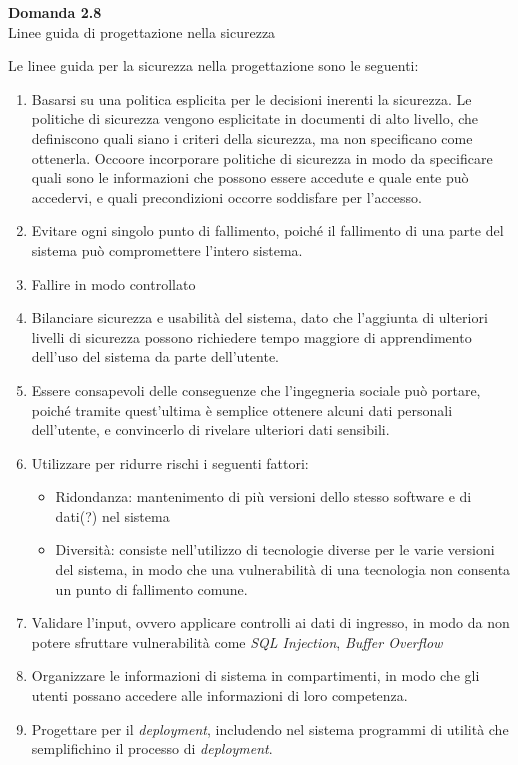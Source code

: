 \documentclass{article}
\newenvironment{problem}[2][Domanda]
    { \begin{mdframed}[backgroundcolor=gray!20] \textbf{#1 #2} \\}
    {  \end{mdframed}}
\begin{document}
\begin{problem}{2.8}
Linee guida di progettazione nella sicurezza
\end{problem}
Le linee guida per la sicurezza nella progettazione sono le seguenti:
\begin{enumerate}
	\item Basarsi su una politica esplicita per le decisioni inerenti la sicurezza.
	\newline
	Le politiche di sicurezza vengono esplicitate in documenti di alto livello, che definiscono quali siano i criteri della sicurezza, ma non specificano come ottenerla.
	Occoore incorporare politiche di sicurezza in modo da specificare quali sono le informazioni che possono essere accedute e quale ente può accedervi, e quali precondizioni occorre soddisfare per l'accesso.
	\item Evitare ogni singolo punto di fallimento, poiché il fallimento di una parte del sistema può compromettere l'intero sistema.
	\item Fallire in modo controllato
	\item Bilanciare sicurezza e usabilità del sistema, dato che l'aggiunta di ulteriori livelli di sicurezza possono richiedere tempo maggiore di apprendimento dell'uso del sistema da parte dell'utente.
	\item Essere consapevoli delle conseguenze che l'ingegneria sociale può portare, poiché tramite quest'ultima è semplice ottenere alcuni dati personali dell'utente, e convincerlo di rivelare ulteriori dati sensibili.
	\item Utilizzare per ridurre rischi i seguenti fattori:
	\begin{itemize}
		\item Ridondanza: mantenimento di più versioni dello stesso software e di dati(?) nel sistema
		\item Diversità: consiste nell'utilizzo di tecnologie diverse per le varie versioni del sistema, in modo che una vulnerabilità di una tecnologia non consenta un punto di fallimento comune.
	\end{itemize}
	\item Validare l'input, ovvero applicare controlli ai dati di ingresso, in modo da non potere sfruttare vulnerabilità come \textit{SQL Injection}, \textit{Buffer Overflow}
	\item Organizzare le informazioni di sistema in compartimenti, in modo che gli utenti possano accedere alle informazioni di loro competenza.
	\item Progettare per il \textit{deployment}, includendo nel sistema programmi di utilità che semplifichino il processo di \textit{deployment}.

\end{enumerate}
\end{document}
